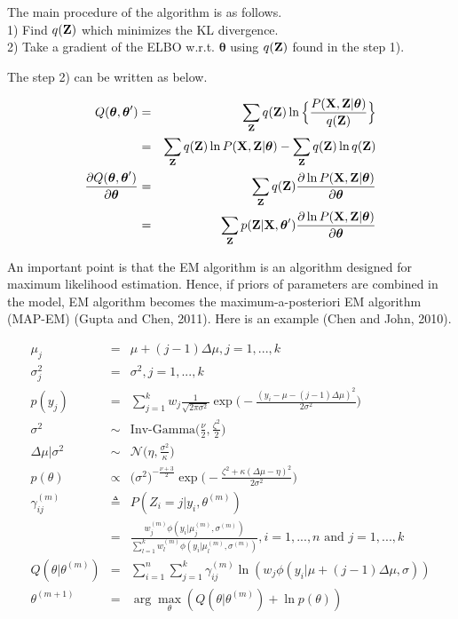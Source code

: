 \documentclass{article}
\begin{document}
The main procedure of the algorithm is as follows. \\
1) Find $q(\bold{Z})$ which minimizes the KL divergence. \\
2) Take a gradient of the ELBO w.r.t. $\boldsymbol{\theta}$ using $q(\bold{Z})$ found in the step 1).\par
The step 2) can be written as below.

	\begin{eqnarray}
	Q(\boldsymbol{\theta}, \boldsymbol{\theta}') &=& \sum_\bold{Z}q(\bold{Z})\ln \Big\{ \frac{P(\bold{X}, \bold{Z}| \boldsymbol{\theta})}{q(\bold{Z})} \Big\} \nonumber \\
	&=& \sum_\bold{Z}q(\bold{Z}) \ln P(\bold{X}, \bold{Z}| \boldsymbol{\theta}) - \sum_\bold{Z}q(\bold{Z})\ln q(\bold{Z})\\
	\frac{\partial Q(\boldsymbol{\theta}, \boldsymbol{\theta}')}{\partial \boldsymbol{\theta}} &=& \sum_\bold{Z} q(\bold{Z}) \frac{\partial \ln P(\bold{X}, \bold{Z}|\boldsymbol{\theta}) }{\partial \boldsymbol{\theta}} \nonumber \\
	&=& \sum_\bold{Z}p(\bold{Z}|\bold{X}, \boldsymbol{\theta}') \frac{\partial \ln P(\bold{X}, \bold{Z}|\boldsymbol{\theta}) }{\partial \boldsymbol{\theta}}
	\end{eqnarray}
	
	An important point is that the EM algorithm is an algorithm designed for maximum likelihood estimation. Hence, if priors of parameters are combined in the model, EM algorithm becomes the maximum-a-posteriori EM algorithm (MAP-EM) (Gupta and Chen, 2011). Here is an example (Chen and John, 2010).
	
	\begin{eqnarray}
		\mu_j &=& \mu + (j-1)\Delta\mu, j = 1,...,k \\
		\sigma^2_j &=& \sigma^2, j = 1,...,k \\
		p(y_j) &=& \sum^k_{j=1} w_j \frac{1}{\sqrt{2\pi \sigma^2}} \exp\Bigg(- \frac{(y_i - \mu - (j - 1)\Delta\mu)^2}{2\sigma^2} \Bigg) \\
		\sigma^2 &\sim & \textrm{Inv-Gamma} \bigg( \frac{\nu}{2}, \frac{\zeta^2}{2} \bigg) \\
		\Delta\mu|\sigma^2 &\sim & \mathcal{N}\bigg( \eta, \frac{\sigma^2}{\kappa} \bigg) \\
		p(\theta) &\propto & \big (\sigma^2 \big)^{-\frac{\nu+3}{2}} \exp \bigg( -\frac{\zeta^2 + \kappa(\Delta\mu - \eta)^2}{2\sigma^2} \bigg) \\
		\gamma^{(m)}_{ij} &\triangleq & P(Z_i = j | y_i, \theta^{(m)}) \nonumber \\
		&=& \frac{w^{(m)}_j \phi(y_i|\mu^{(m)}_j, \sigma^{(m)})}{\sum^k_{l=1}w^{(m)}_l \phi(y_i|\mu^{(m)}_l, \sigma^{(m)})}, i=1,...,n \textrm{ and } j=1,...,k \\
		Q(\theta | \theta^{(m)}) &=& \sum^n_{i=1} \sum^k_{j=1} \gamma^{(m)}_{ij} \ln(w_j \phi(y_i | \mu + (j-1)\Delta\mu, \sigma)) \\
		\theta^{(m+1)} &=& \arg\max_{\theta} (Q(\theta | \theta^{(m)}) + \ln p(\theta))
	\end{eqnarray}
\end{document}
